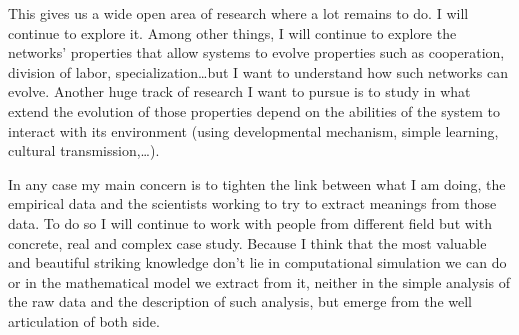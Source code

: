 \documentclass[10pt]{article}
\begin{document}
This gives us a wide open area of research where a lot remains to do.  I will continue to explore it. Among other things, I will continue to explore the networks' properties that allow systems to evolve properties such as cooperation, division of labor, specialization\ldots but I want to understand how such networks can evolve. Another huge track of research I want to pursue is to study in what extend the evolution of those properties depend on the abilities of the system to interact with its environment (using developmental mechanism, simple learning, cultural transmission,\ldots). 

In any case my main concern is to tighten the link between what I am doing, the empirical data and the scientists working to try to extract meanings from those data. To do so I will continue to work with people from different field but with concrete, real and complex case study. Because I think that the most valuable and beautiful striking knowledge don't lie in computational simulation we can do or in the mathematical model we extract from it, neither in the simple analysis of the raw data and the description of such analysis, but emerge from the well articulation of both side.




                   
\end{document}
